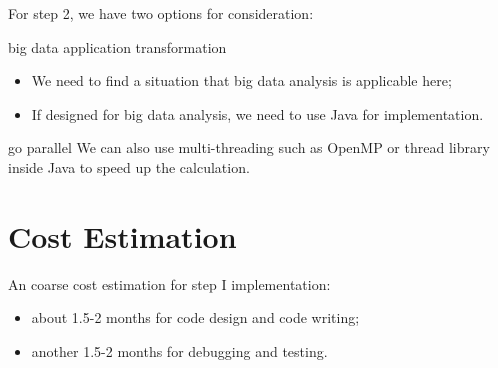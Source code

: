 \documentclass[notheorems, aspectratio=54]{beamer}
\begin{document}
\begin{frame}[fragile]

For step 2, we have two options for consideration:
\begin{block}{big data application transformation}
 \begin{itemize}
 \item  We need to find a situation that big data analysis is applicable here;
 \item  If designed for big data analysis, we need to use Java for implementation.
\end{itemize}
\end{block}

\begin{block}{go parallel}
 We can also use multi-threading such as OpenMP or thread library inside Java to speed up the calculation.
\end{block}

\end{frame}

\section{Cost Estimation}
\begin{frame}

An coarse cost estimation for step I implementation:
\begin{itemize}
 \item about 1.5-2 months for code design and code writing;
 \item another 1.5-2 months for debugging and testing.
\end{itemize}


\end{frame}

\end{document}
